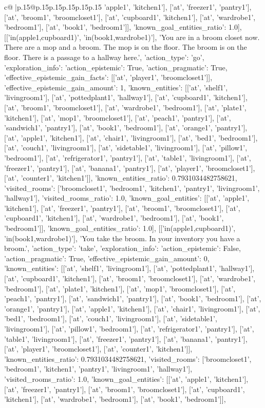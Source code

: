 \documentclass{article}
\begin{document}
{\begin{supertabular}{c@{$\;$}|p{.15\linewidth}@{}p{.15\linewidth}p{.15\linewidth}p{.15\linewidth}p{.15\linewidth}p{.15\linewidth}}
{{{'apple1', 'kitchen1'], ['at', 'freezer1', 'pantry1'], ['at', 'broom1', 'broomcloset1'], ['at', 'cupboard1', 'kitchen1'], ['at', 'wardrobe1', 'bedroom1'], ['at', 'book1', 'bedroom1']], 'known_goal_entities_ratio': 1.0}}], [['in(apple1,cupboard1)', 'in(book1,wardrobe1)'], 'You are in a broom closet now. There are a mop and a broom. The mop is on the floor. The broom is on the floor. There is a passage to a hallway here.', {'action_type': 'go', 'exploration_info': {'action_epistemic': True, 'action_pragmatic': True, 'effective_epistemic_gain_facts': [['at', 'player1', 'broomcloset1']], 'effective_epistemic_gain_amount': 1, 'known_entities': [['at', 'shelf1', 'livingroom1'], ['at', 'pottedplant1', 'hallway1'], ['at', 'cupboard1', 'kitchen1'], ['at', 'broom1', 'broomcloset1'], ['at', 'wardrobe1', 'bedroom1'], ['at', 'plate1', 'kitchen1'], ['at', 'mop1', 'broomcloset1'], ['at', 'peach1', 'pantry1'], ['at', 'sandwich1', 'pantry1'], ['at', 'book1', 'bedroom1'], ['at', 'orange1', 'pantry1'], ['at', 'apple1', 'kitchen1'], ['at', 'chair1', 'livingroom1'], ['at', 'bed1', 'bedroom1'], ['at', 'couch1', 'livingroom1'], ['at', 'sidetable1', 'livingroom1'], ['at', 'pillow1', 'bedroom1'], ['at', 'refrigerator1', 'pantry1'], ['at', 'table1', 'livingroom1'], ['at', 'freezer1', 'pantry1'], ['at', 'banana1', 'pantry1'], ['at', 'player1', 'broomcloset1'], ['at', 'counter1', 'kitchen1']], 'known_entities_ratio': 0.7931034482758621, 'visited_rooms': ['broomcloset1', 'bedroom1', 'kitchen1', 'pantry1', 'livingroom1', 'hallway1'], 'visited_rooms_ratio': 1.0, 'known_goal_entities': [['at', 'apple1', 'kitchen1'], ['at', 'freezer1', 'pantry1'], ['at', 'broom1', 'broomcloset1'], ['at', 'cupboard1', 'kitchen1'], ['at', 'wardrobe1', 'bedroom1'], ['at', 'book1', 'bedroom1']], 'known_goal_entities_ratio': 1.0}}], [['in(apple1,cupboard1)', 'in(book1,wardrobe1)'], 'You take the broom. In your inventory you have a broom.', {'action_type': 'take', 'exploration_info': {'action_epistemic': False, 'action_pragmatic': True, 'effective_epistemic_gain_amount': 0, 'known_entities': [['at', 'shelf1', 'livingroom1'], ['at', 'pottedplant1', 'hallway1'], ['at', 'cupboard1', 'kitchen1'], ['at', 'broom1', 'broomcloset1'], ['at', 'wardrobe1', 'bedroom1'], ['at', 'plate1', 'kitchen1'], ['at', 'mop1', 'broomcloset1'], ['at', 'peach1', 'pantry1'], ['at', 'sandwich1', 'pantry1'], ['at', 'book1', 'bedroom1'], ['at', 'orange1', 'pantry1'], ['at', 'apple1', 'kitchen1'], ['at', 'chair1', 'livingroom1'], ['at', 'bed1', 'bedroom1'], ['at', 'couch1', 'livingroom1'], ['at', 'sidetable1', 'livingroom1'], ['at', 'pillow1', 'bedroom1'], ['at', 'refrigerator1', 'pantry1'], ['at', 'table1', 'livingroom1'], ['at', 'freezer1', 'pantry1'], ['at', 'banana1', 'pantry1'], ['at', 'player1', 'broomcloset1'], ['at', 'counter1', 'kitchen1']], 'known_entities_ratio': 0.7931034482758621, 'visited_rooms': ['broomcloset1', 'bedroom1', 'kitchen1', 'pantry1', 'livingroom1', 'hallway1'], 'visited_rooms_ratio': 1.0, 'known_goal_entities': [['at', 'apple1', 'kitchen1'], ['at', 'freezer1', 'pantry1'], ['at', 'broom1', 'broomcloset1'], ['at', 'cupboard1', 'kitchen1'], ['at', 'wardrobe1', 'bedroom1'], ['at', 'book1', 'bedroom1']], }}}
\end{supertabular}}
\end{document}
